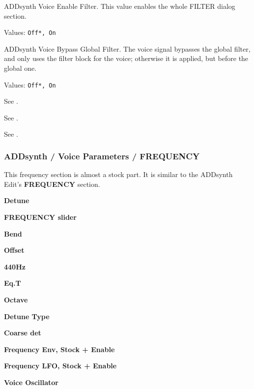    ADDsynth Voice Enable Filter.
   This value enables the whole FILTER dialog section.

   Values: \texttt{Off*, On}

   ADDsynth Voice Bypass Global Filter.
   The voice signal bypasses the global filter,
   and only uses the filter block for the voice;
   otherwise it is applied, but before the global one.

   Values: \texttt{Off*, On}

   See .

   See .

   See .

\subsubsection{ADDsynth / Voice Parameters / FREQUENCY}
\label{subsubsec:addsynth_voice_parameters_frequency}

   This frequency section is almost a stock part.
   It is similar to the ADDsynth Edit's \textbf{FREQUENCY} section.

   \begin{enumber}
      \item \textbf{Detune}
      \item \textbf{FREQUENCY slider}
      \item \textbf{Bend}
      \item \textbf{Offset}
      \item \textbf{440Hz}          %
      \item \textbf{Eq.T}          %
      \item \textbf{Octave}
      \item \textbf{Detune Type}
      \item \textbf{Coarse det}
      \item \textbf{Frequency Env, Stock + Enable}
      \item \textbf{Frequency LFO, Stock + Enable}
      \item \textbf{Voice Oscillator}
   \end{enumber}


